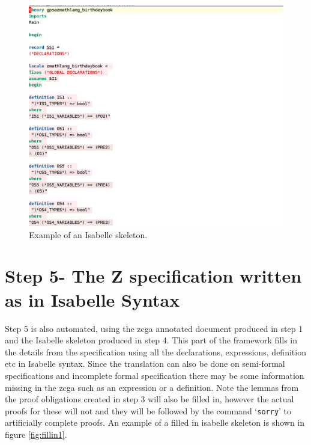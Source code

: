\begin{figure}[H]
 \begin{center}
 \includegraphics [scale=0.2]{Figures/Design/isaskeleton.png}
 \caption{Example of an Isabelle skeleton.}
 \label{fig:isaskelexample}
\end{center}
\end{figure} 

\section{Step 5- The Z specification written as in Isabelle Syntax}

Step 5 is also automated, using the \gls{zcga} annotated document produced in step 1 and the Isabelle skeleton produced in step 4. This part of the framework fills in the details from the specification using all the declarations, expressions, definition etc in Isabelle syntax. Since the translation can also be done on semi-formal specifications and incomplete formal specification there may be some information missing in the \gls{zcga} such as an expression or a definition. Note the lemmas from the proof obligations created in step 3 will also be filled in, however the actual proofs for these will not and they will be followed by the command `\texttt{sorry}' to artificially complete proofs. An example of a filled in isabelle skeleton is shown in figure \ref{fig:fillin1}.

